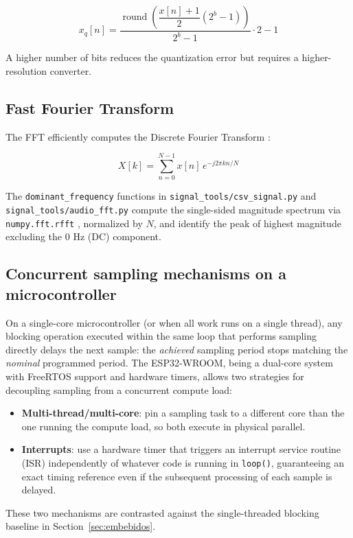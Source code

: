 \begin{equation}
x_q[n] = \frac{\operatorname{round}\!\left(\dfrac{x[n]+1}{2}(2^b-1)\right)}{2^b-1}\cdot 2 - 1
\end{equation}

A higher number of bits reduces the quantization error but requires a higher-resolution converter.

\subsection{Fast Fourier Transform}

The FFT efficiently computes the Discrete Fourier Transform \cite{lyons}:

\begin{equation}
X[k] = \sum_{n=0}^{N-1} x[n]\,e^{-j2\pi kn/N}
\end{equation}

The \texttt{dominant\_frequency} functions in \texttt{signal\_tools/csv\_signal.py} and \texttt{signal\_tools/audio\_fft.py} compute the single-sided magnitude spectrum via \texttt{numpy.fft.rfft} \cite{numpy}, normalized by $N$, and identify the peak of highest magnitude excluding the $0$ Hz (DC) component.

\subsection{Concurrent sampling mechanisms on a microcontroller}

On a single-core microcontroller (or when all work runs on a single thread), any blocking operation executed within the same loop that performs sampling directly delays the next sample: the \emph{achieved} sampling period stops matching the \emph{nominal} programmed period. The ESP32-WROOM, being a dual-core system with FreeRTOS support and hardware timers, allows two strategies for decoupling sampling from a concurrent compute load:

\begin{itemize}
\item \textbf{Multi-thread/multi-core}: pin a sampling task to a different core than the one running the compute load, so both execute in physical parallel.
\item \textbf{Interrupts}: use a hardware timer that triggers an interrupt service routine (ISR) independently of whatever code is running in \texttt{loop()}, guaranteeing an exact timing reference even if the subsequent processing of each sample is delayed.
\end{itemize}

These two mechanisms are contrasted against the single-threaded blocking baseline in Section~\ref{sec:embebidos}.
